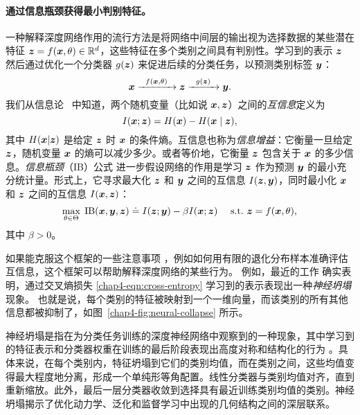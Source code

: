 \documentclass[../../book-main_zh.tex]{subfiles}
\begin{document}
\paragraph{通过信息瓶颈获得最小判别特征。}
一种解释深度网络作用的流行方法是将网络中间层的输出视为选择数据的某些潜在特征 $\bm{z} = f(\bm{x}, \theta) \in \mathbb{R}^d$，这些特征在多个类别之间具有判别性。学习到的表示 $\bm{z}$ 然后通过优化一个分类器 $g(\bm{z})$ 来促进后续的分类任务，以预测类别标签 $\bm{y}$：
\begin{equation}
	\bm{x}   \xrightarrow{\hspace{2mm} f(\bm{x}, \theta)\hspace{2mm}} \bm{z}  \xrightarrow{\hspace{2mm} g(\bm{z}) \hspace{2mm}} \bm{y}.
\end{equation}
我们从信息论~\cite{Cover-Thomas} 中知道，两个随机变量（比如说 $\bm{x},\bm{z}$）之间的{\em 互信息}定义为
\begin{equation}
	I(\bm{x}; \bm{z}) = H(\bm{x}) - H(\bm{x}\mid \bm{z}),
\end{equation}
其中 $H(\bm{x} \vert \bm{z})$ 是给定 $\bm{z}$ 时 $\bm{x}$ 的条件熵。互信息也称为{\em 信息增益}：它衡量一旦给定 $\bm{z}$，随机变量 $\bm{x}$ 的熵可以减少多少。或者等价地，它衡量 $\bm{z}$ 包含关于 $\bm{x}$ 的多少信息。{\em 信息瓶颈}（IB）公式 \cite{Tishby-ITW2015} 进一步假设网络的作用是学习 $\bm{z}$ 作为预测 $\bm{y}$ 的最小充分统计量。形式上，它寻求最大化 $\bm{z}$ 和 $\bm{y}$ 之间的互信息 $I(\bm{z}, \bm{y})$，同时最小化 $\bm{x}$ 和 $\bm{z}$ 之间的互信息 $I(\bm{x}, \bm{z})$：
\begin{equation}
	\max_{\theta\in \Theta}\; \mbox{IB}(\bm{x}, \bm{y}, \bm{z}) \doteq I(\bm{z}; \bm{y}) - \beta I(\bm{x}; \bm{z}) \quad\ \mathrm{s.t.}\ \bm{z} = f(\bm{x}, \theta),
	\label{chap4-eqn:information-bottleneck}
\end{equation}
其中 $\beta >0$。

如果能克服这个框架的一些注意事项 \cite{kolchinsky2018caveats-ICLR2018}，例如如何用有限的退化分布样本准确评估互信息，这个框架可以帮助解释深度网络的某些行为。
例如，最近的工作 \cite{papyan2020prevalence} 确实表明，通过交叉熵损失 \eqref{chap4-eqn:cross-entropy} 学习到的表示表现出一种\emph{神经坍塌}现象。
也就是说，每个类别的特征被映射到一个一维向量，而该类别的所有其他信息都被抑制了，如图~\ref{chap4-fig:neural-collapse} 所示。
\begin{remark}
    神经坍塌是指在为分类任务训练的深度神经网络中观察到的一种现象，其中学习到的特征表示和分类器权重在训练的最后阶段表现出高度对称和结构化的行为 \cite{papyan2020prevalence,zhu2021geometric}。具体来说，在每个类别内，特征坍塌到它们的类别均值，而在类别之间，这些均值变得最大程度地分离，形成一个单纯形等角配置。线性分类器与类别均值对齐，直到重新缩放。此外，最后一层分类器收敛到选择具有最近训练类别均值的类别。神经坍塌揭示了优化动力学、泛化和监督学习中出现的几何结构之间的深层联系。
\end{remark}
\end{document}
